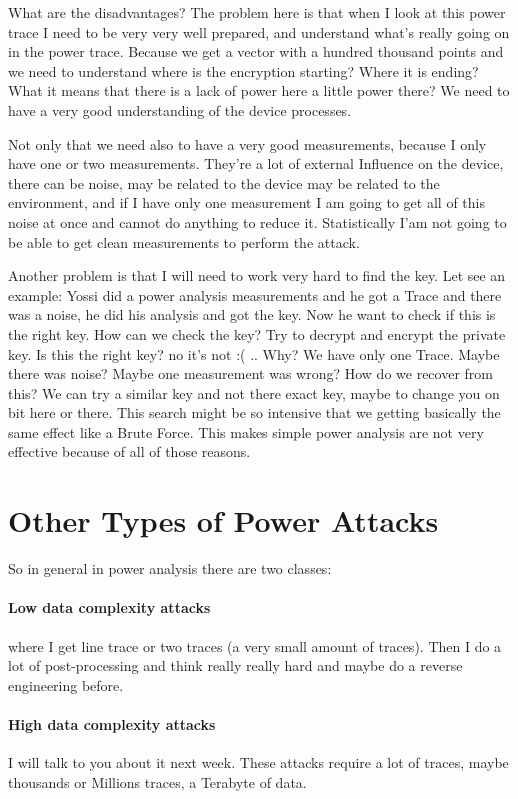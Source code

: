 What are the disadvantages? The problem here is that when I look at this power trace I need to be very very well prepared, and understand what's really going on in the power trace. Because we get a vector with a hundred thousand points and we need to understand where is the encryption starting? Where it is ending? What it means that there is a lack of power here a little power there? We need to have a very good understanding of the device processes. 

Not only that we need also to have a very good measurements, because I only have one or two measurements. They're a lot of external Influence on the device, there can be noise, may be related to the device may be related to the environment, and if I have only one measurement I am going to get all of this noise at once and cannot do anything to reduce it. Statistically I'am not going to be able to get clean measurements to perform the attack.

Another problem is that I will need to work very hard to find the key. Let see an example: Yossi did a power analysis measurements and he got a Trace and there was a noise, he did his analysis and got the key. Now he want to check if this is the right key. How can we check the key? Try to decrypt and encrypt the private key. Is this the right key? no it's not :( .. Why? We have only one Trace. Maybe there was noise? Maybe one measurement was wrong? How do we recover from this? We can try a similar key and not there exact key, maybe to change you on bit here or there. This search might be so intensive that we getting basically the same effect like a Brute Force. This makes simple power analysis are not very effective because of all of those reasons.

\section{Other Types of Power Attacks}

So in general in power analysis there are two classes:

\paragraph{Low data complexity attacks} where I get line trace or two traces (a very small amount of traces). Then I do a lot of post-processing and think really really hard and maybe do a reverse engineering before.

\paragraph{High data complexity attacks} I will talk to you about it next week. These attacks require a lot of traces, maybe thousands or Millions traces, a Terabyte of data.

